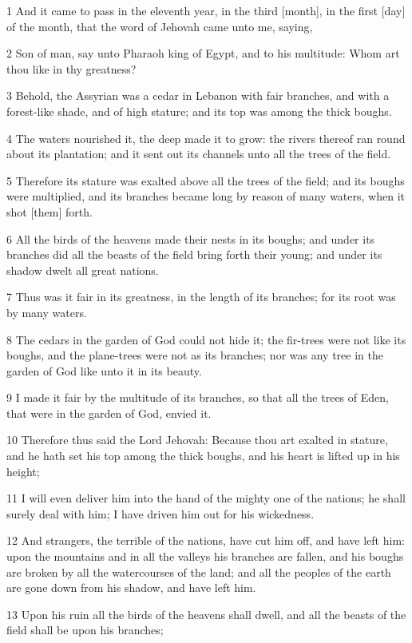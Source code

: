 \par 1 And it came to pass in the eleventh year, in the third [month], in the first [day] of the month, that the word of Jehovah came unto me, saying,
\par 2 Son of man, say unto Pharaoh king of Egypt, and to his multitude: Whom art thou like in thy greatness?
\par 3 Behold, the Assyrian was a cedar in Lebanon with fair branches, and with a forest-like shade, and of high stature; and its top was among the thick boughs.
\par 4 The waters nourished it, the deep made it to grow: the rivers thereof ran round about its plantation; and it sent out its channels unto all the trees of the field.
\par 5 Therefore its stature was exalted above all the trees of the field; and its boughs were multiplied, and its branches became long by reason of many waters, when it shot [them] forth.
\par 6 All the birds of the heavens made their nests in its boughs; and under its branches did all the beasts of the field bring forth their young; and under its shadow dwelt all great nations.
\par 7 Thus was it fair in its greatness, in the length of its branches; for its root was by many waters.
\par 8 The cedars in the garden of God could not hide it; the fir-trees were not like its boughs, and the plane-trees were not as its branches; nor was any tree in the garden of God like unto it in its beauty.
\par 9 I made it fair by the multitude of its branches, so that all the trees of Eden, that were in the garden of God, envied it.
\par 10 Therefore thus said the Lord Jehovah: Because thou art exalted in stature, and he hath set his top among the thick boughs, and his heart is lifted up in his height;
\par 11 I will even deliver him into the hand of the mighty one of the nations; he shall surely deal with him; I have driven him out for his wickedness.
\par 12 And strangers, the terrible of the nations, have cut him off, and have left him: upon the mountains and in all the valleys his branches are fallen, and his boughs are broken by all the watercourses of the land; and all the peoples of the earth are gone down from his shadow, and have left him.
\par 13 Upon his ruin all the birds of the heavens shall dwell, and all the beasts of the field shall be upon his branches;
